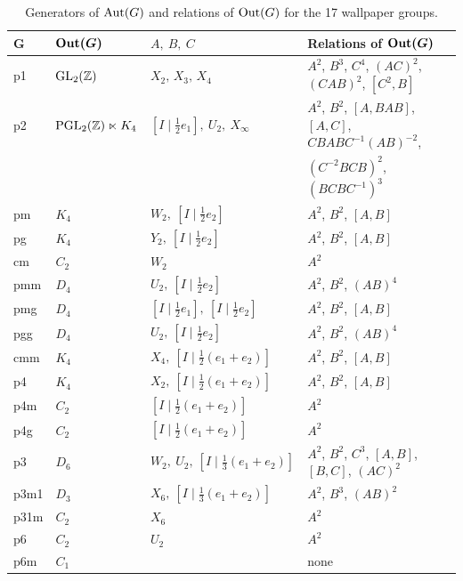 \begin{table}[!htbp]
\centering
\small
\begin{tabular}{ll|l|l}
\toprule
 $\boldsymbol{G}$ & $\boldsymbol{\operatorname{Out}(G)}$  & $A, \ B, \ C$ &  Relations of $\boldsymbol{\operatorname{Out} (G)}$ \\
\midrule
p1   & $\operatorname{GL}_2 ({\mathbb Z})$  & $X_2, \, X_3, \, X_4$ &  $A^2$, $B^3$, $C^4$, $(AC)^2$, $(CAB)^2$, $[C^2,B]$ \\
p2   & $\operatorname{PGL}_2 ({\mathbb Z})\ltimes K_4$   & $[I \mid\tfrac12 e_1], \ U_2, \ X_{\infty}$ & $A^2$, $B^2$, $[A,BAB]$,  $[A,C]$, $CBABC^{-1}(AB)^{-2}$, \\
   &   &  & $(C^{-2}BCB)^2$, $(BCBC^{-1})^3$ \\
\midrule
pm   & $K_4$  &  $W_2, \ [I \mid\tfrac12 e_2]$ & $A^2$, $B^2$, $[A,B]$ \\
pg   & $K_4$ &  $Y_2, \ [I \mid\tfrac12 e_2]$ & $A^2$, $B^2$, $[A,B]$ \\
cm   & $C_2$  & $W_2$ & $A^2$ \\
pmm  & $D_4$ &  $U_2, \ [I \mid\tfrac12 e_2]$ & $A^2$, $B^2$, $(AB)^4$ \\
pmg  & $D_4$ &  $[I \mid\tfrac12 e_1], \ [I \mid\tfrac12 e_2]$ & $A^2$, $B^2$, $[A,B]$ \\
pgg  & $D_4$ &  $U_2, \ [I \mid\tfrac12 e_2]$ & $A^2$, $B^2$, $(AB)^4$ \\
cmm  & $K_4$ &  $X_4, \ [I \mid\tfrac12 (e_1+ e_2)]$ &  $A^2$, $B^2$, $[A,B]$ \\
\midrule
p4   &   $K_4$ & $X_2, \ [I \mid\tfrac12 (e_1+ e_2)]$ &  $A^2$, $B^2$, $[A,B]$ \\
p4m  &  $C_2$    & $[I \mid\tfrac12 (e_1+ e_2)]$ & $A^2$ \\
p4g  &  $C_2$    & $[I \mid\tfrac12 (e_1+ e_2)]$ & $A^2$ \\
\midrule
p3   &  $D_6$   & $W_2, \ U_2, \ [I \mid\tfrac13 (e_1+ e_2)]$ &  $A^2$, $B^2$, $C^3$, $[A,B]$, $[B,C]$, $(AC)^2$ \\
p3m1 &  $D_3$    &  $X_6, \ [I \mid\tfrac13 (e_1+ e_2)]$ &  $A^2$, $B^3$, $(AB)^2$ \\
p31m &  $C_2$   &  $X_6$ &  $A^2$ \\
p6   &  $C_2$   & $U_2$ & $A^2$ \\
p6m  &  $C_1$    &  &  none \\
\bottomrule
\end{tabular}
\caption{Generators of $\operatorname{Aut} (G)$ and relations of $\operatorname{Out} (G)$ for the 17 wallpaper groups.}
\label{table:wallpaper2_geb}
\end{table}

